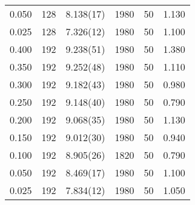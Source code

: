 \begin{tabular}{rrlrrr}
 0.050 &     128 & 8.138(17)  &                1980 &                  50 &    1.130 \\
 0.025 &     128 & 7.326(12)  &                1980 &                  50 &    1.100 \\
 0.400 &     192 & 9.238(51)  &                1980 &                  50 &    1.380 \\
 0.350 &     192 & 9.252(48)  &                1980 &                  50 &    1.110 \\
 0.300 &     192 & 9.182(43)  &                1980 &                  50 &    0.980 \\
 0.250 &     192 & 9.148(40)  &                1980 &                  50 &    0.790 \\
 0.200 &     192 & 9.068(35)  &                1980 &                  50 &    1.130 \\
 0.150 &     192 & 9.012(30)  &                1980 &                  50 &    0.940 \\
 0.100 &     192 & 8.905(26)  &                1820 &                  50 &    0.790 \\
 0.050 &     192 & 8.469(17)  &                1980 &                  50 &    1.100 \\
 0.025 &     192 & 7.834(12)  &                1980 &                  50 &    1.050 \\
\hline
\end{tabular}

